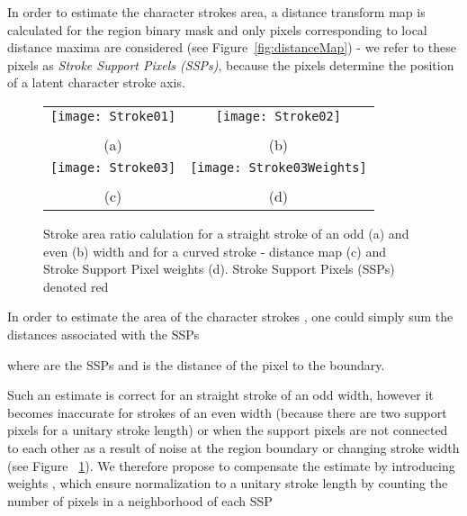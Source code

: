 \documentclass[conference]{IEEEtran}
\begin{document}
In order to estimate the character strokes area, a distance transform map is calculated for the region binary mask and only pixels corresponding to local distance maxima are considered (see Figure~\ref{fig:distanceMap}) - we refer to these pixels as \emph{Stroke Support Pixels (SSPs)}, because the pixels determine the position of a latent character stroke axis.

\begin{figure}
\setlength{\tabcolsep}{1pt}
\centering
\begin{tabular}{cc}
\texttt{[image: Stroke01]} &
\texttt{[image: Stroke02]} \\
\scriptsize
 {} &
\scriptsize
 {} \vspace{3pt} \\
\small (a) & \small (b) \\

\texttt{[image: Stroke03]} &
\texttt{[image: Stroke03Weights]} \\
\multicolumn{2}{c}{
\scriptsize
 {} \vspace{3pt}}  \\
\small (c) & \small (d) \\
\end{tabular}
\caption{Stroke area ratio  calulation for a straight stroke of an odd (a) and even (b) width and for a curved stroke - distance map  (c) and Stroke Support Pixel weights  (d). Stroke Support Pixels (SSPs) denoted red}
\label{fig:strokes}
\vspace{-15pt}
\end{figure}

In order to estimate the area of the character strokes , one could simply sum the distances associated with the SSPs

where  are the SSPs and  is the distance of the pixel  to the boundary.

Such an estimate is correct for an straight stroke of an odd width, however it becomes inaccurate for strokes of an even width (because there are two support pixels for a unitary stroke length) or when the support pixels are not connected to each other as a result of noise at the region boundary or changing stroke width (see Figure ~\ref{fig:strokes}). We therefore propose to compensate the estimate by introducing weights , which ensure normalization to a unitary stroke length by counting the number of pixels in a  neighborhood of each SSP
\end{document}
